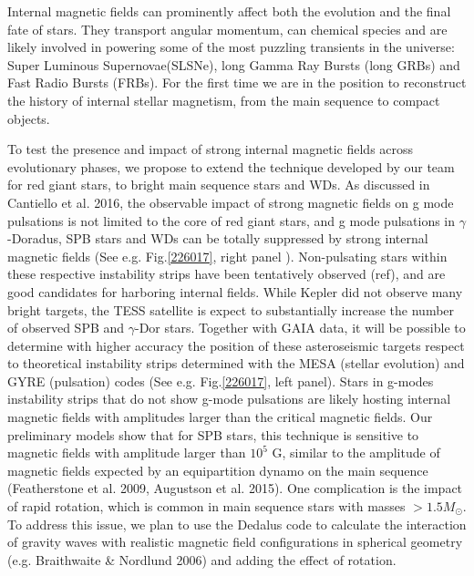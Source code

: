 Internal magnetic fields can prominently affect both the evolution and the final fate of stars. They transport angular momentum, can chemical species
and are likely involved in powering some of the most puzzling transients in the universe: Super Luminous Supernovae(SLSNe), long Gamma Ray Bursts (long GRBs) and Fast Radio Bursts (FRBs).
For the first time we are in the position to reconstruct the history of internal stellar magnetism, from the main sequence to compact objects.

To test the presence and impact of strong internal magnetic fields across evolutionary phases,
we propose to extend the technique developed by our team for red giant stars, to bright main sequence stars and WDs.
As discussed in Cantiello et al. 2016, the observable impact of strong magnetic fields on g mode pulsations is not limited to the core of red giant stars, and
 g mode pulsations in $\gamma$-Doradus, SPB stars and WDs can be totally suppressed by strong internal magnetic fields (See e.g. Fig.\ref{226017}, right panel ).
Non-pulsating stars within these respective instability strips have been tentatively observed (ref), and are good candidates for harboring internal fields.
While Kepler did not observe many bright targets, the TESS satellite is expect to substantially increase the number of observed SPB and $\gamma$-Dor stars.
Together with GAIA data, it will be possible to determine with higher accuracy the position of these asteroseismic targets respect to
theoretical instability strips determined with the MESA (stellar evolution) and GYRE (pulsation) codes (See e.g. Fig.\ref{226017}, left panel).
Stars in g-modes instability strips that do not show g-mode pulsations are likely hosting internal magnetic fields with amplitudes larger than the critical
magnetic fields. Our preliminary models show that for SPB stars, this technique is sensitive to magnetic fields with amplitude larger than $10^5$ G,
similar to the amplitude of magnetic fields expected by an equipartition dynamo on the main sequence (Featherstone et al. 2009, Augustson et al. 2015).
One complication is the impact of rapid rotation, which is common in main sequence stars with masses $> 1.5M_\odot$. To address this issue,
we plan to use the Dedalus code to calculate the interaction of gravity waves with realistic magnetic field configurations in spherical geometry (e.g. Braithwaite \& Nordlund 2006)
and adding the effect of rotation.
